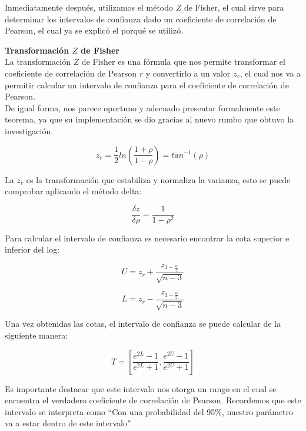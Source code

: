 Inmediatamente después, utilizamos el método $Z$ de Fisher, el cual sirve para determinar los intervalos de confianza dado un coeficiente de correlación de Pearson, el cual ya se explicó el porqué se utilizó. \\

\pagebreak

\textbf{Transformación $Z$ de Fisher} \\

La transformación $Z$ de Fisher es una fórmula que nos permite transformar el coeficiente de correlación de Pearson $r$ y convertirlo a un valor $z_r$, el cual nos va a permitir calcular un intervalo de confianza para el coeficiente de correlación de Pearson. \\

De igual forma, nos parece oportuno y adecuado presentar formalmente este teorema, ya que su implementación se dio gracias al nuevo rumbo que obtuvo la investigación. \\

    \begin{theorem}
        $$z_r=\frac{1}{2}ln(\frac{1+\rho}{1-\rho})=tan^{-1}(\rho)$$
    
        La $z_r$ es la transformación que estabiliza y normaliza la varianza, esto se puede comprobar aplicando el método delta:
    
        $$\frac{\delta z}{\delta \rho}=\frac{1}{1-\rho^2}$$
    
        Para calcular el intervalo de confianza es necesario encontrar la cota superior e inferior del log:
    
        $$U=z_r + \frac{z_{1-\frac{\alpha}{2}}}{\sqrt{n-3}}$$    
    
        $$L=z_r - \frac{z_{1-\frac{\alpha}{2}}}{\sqrt{n-3}}$$
    
        Una vez obtenidas las cotas, el intervalo de confianza se puede calcular de la siguiente manera:
    
        $$T=[\frac{e^{2L}-1}{e^{2L}+1},\frac{e^{2U}-1}{e^{2U}+1}]$$

    \end{theorem}

Es importante destacar que este intervalo nos otorga un rango en el cual se encuentra el verdadero coeficiente de correlación de Pearson. Recordemos que este intervalo se interpreta como ``Con una probabilidad del 95\%, nuestro parámetro va a estar dentro de este intervalo''.\\


